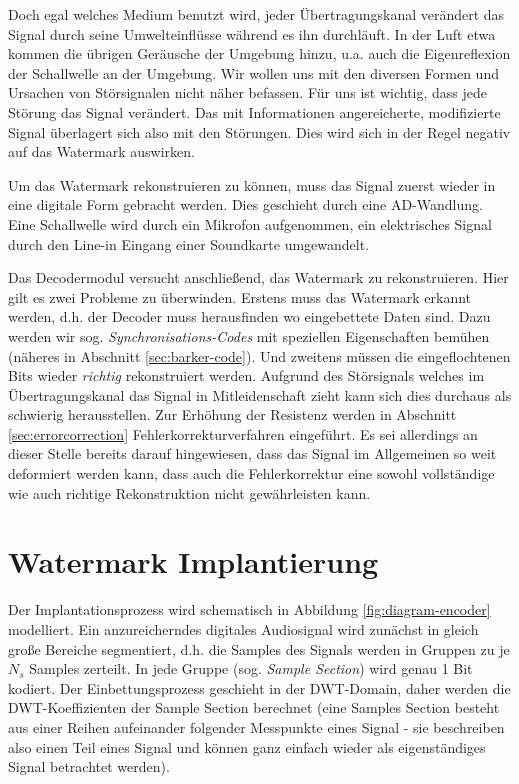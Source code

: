 Doch egal welches Medium benutzt wird, jeder Übertragungskanal verändert das Signal durch seine Umwelteinflüsse während es ihn durchläuft. In der Luft etwa kommen die übrigen Geräusche der Umgebung hinzu, u.a. auch die Eigenreflexion der Schallwelle an der Umgebung. 
Wir wollen uns mit den diversen Formen und Ursachen von Störsignalen nicht näher befassen. Für uns ist wichtig, dass jede Störung das Signal verändert. Das mit Informationen angereicherte, modifizierte Signal überlagert sich also mit den Störungen. Dies wird sich in der Regel negativ auf das Watermark auswirken. 

Um das Watermark rekonstruieren zu können, muss das Signal zuerst wieder in eine digitale Form gebracht werden. Dies geschieht durch eine AD-Wandlung. Eine Schallwelle wird durch ein Mikrofon aufgenommen, ein elektrisches Signal durch den Line-in Eingang einer Soundkarte umgewandelt. 

Das Decodermodul versucht anschließend, das Watermark zu rekonstruieren. Hier gilt es zwei Probleme zu überwinden. Erstens muss das Watermark erkannt werden, d.h. der Decoder muss herausfinden wo eingebettete Daten sind. Dazu werden wir sog. \textit{Synchronisations-Codes} mit speziellen Eigenschaften bemühen (näheres in Abschnitt \ref{sec:barker-code}). Und zweitens müssen die eingeflochtenen Bits wieder \textit{richtig} rekonstruiert werden. Aufgrund des Störsignals welches im Übertragungskanal das Signal in Mitleidenschaft zieht kann sich dies durchaus als schwierig herausstellen. Zur Erhöhung der Resistenz werden in Abschnitt \ref{sec:errorcorrection} Fehlerkorrekturverfahren eingeführt. Es sei allerdings an dieser Stelle bereits darauf hingewiesen, dass das Signal im Allgemeinen so weit deformiert werden kann, dass auch die Fehlerkorrektur eine sowohl vollständige wie auch richtige Rekonstruktion nicht gewährleisten kann. 

\section{Watermark Implantierung}
\label{sec:embedding}

Der Implantationsprozess wird schematisch in Abbildung \ref{fig:diagram-encoder} modelliert. Ein anzureicherndes digitales Audiosignal wird zunächst in gleich große Bereiche segmentiert, d.h. die Samples des Signals werden in Gruppen zu je $N_s$ Samples zerteilt. In jede Gruppe (sog. \textit{Sample Section}) wird genau 1 Bit kodiert. Der Einbettungsprozess geschieht in der DWT-Domain, daher werden die DWT-Koeffizienten  der Sample Section berechnet (eine Samples Section besteht aus einer Reihen aufeinander folgender Messpunkte eines Signal - sie beschreiben also einen Teil eines Signal und können ganz einfach wieder als eigenständiges Signal betrachtet werden). 

